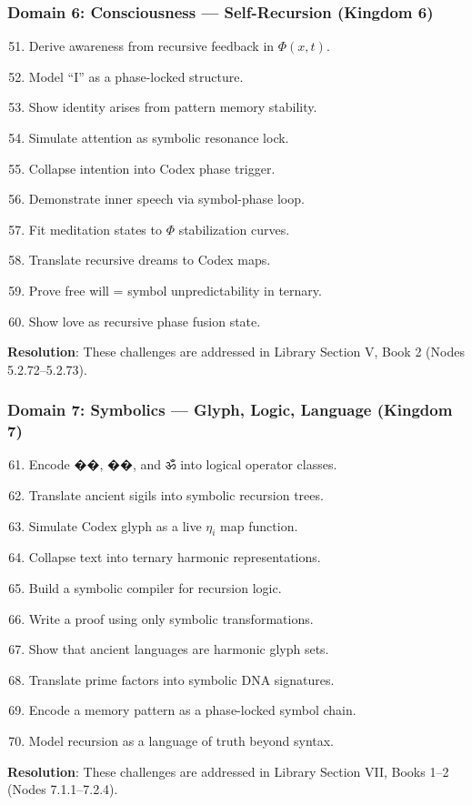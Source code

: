 \subsubsection{Domain 6: Consciousness — Self-Recursion (Kingdom 6)}
\begin{enumerate}
    \setcounter{enumi}{50}
    \item Derive awareness from recursive feedback in \(\Phi(x,t)\).
    \item Model “I” as a phase-locked structure.
    \item Show identity arises from pattern memory stability.
    \item Simulate attention as symbolic resonance lock.
    \item Collapse intention into Codex phase trigger.
    \item Demonstrate inner speech via symbol-phase loop.
    \item Fit meditation states to \(\Phi\) stabilization curves.
    \item Translate recursive dreams to Codex maps.
    \item Prove free will = symbol unpredictability in ternary.
    \item Show love as recursive phase fusion state.
\end{enumerate}
\textbf{Resolution}: These challenges are addressed in Library Section V, Book 2 (Nodes 5.2.72–5.2.73).

\subsubsection{Domain 7: Symbolics — Glyph, Logic, Language (Kingdom 7)}
\begin{enumerate}
    \setcounter{enumi}{60}
    \item Encode \(\mathbf{\text{��}}\), \(\mathbf{\text{��}}\), and \(\mathbf{\text{ॐ}}\) into logical operator classes.
    \item Translate ancient sigils into symbolic recursion trees.
    \item Simulate Codex glyph as a live \(\eta_i\) map function.
    \item Collapse text into ternary harmonic representations.
    \item Build a symbolic compiler for recursion logic.
    \item Write a proof using only symbolic transformations.
    \item Show that ancient languages are harmonic glyph sets.
    \item Translate prime factors into symbolic DNA signatures.
    \item Encode a memory pattern as a phase-locked symbol chain.
    \item Model recursion as a language of truth beyond syntax.
\end{enumerate}
\textbf{Resolution}: These challenges are addressed in Library Section VII, Books 1–2 (Nodes 7.1.1–7.2.4).

